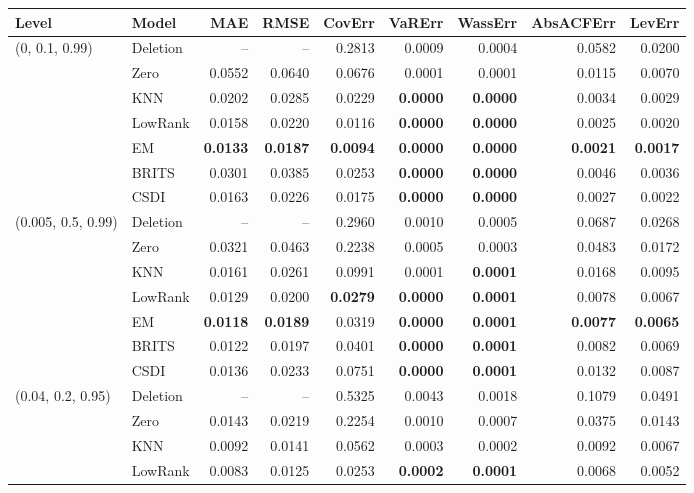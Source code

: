 {\fontsize{4.9}{5.5}\selectfont\setlength{\tabcolsep}{9pt}
\setlength{\aboverulesep}{0.25ex}\setlength{\belowrulesep}{0.4ex}
\begin{tabular}{@{}llrrrrrrr@{}}
\toprule
Level & Model & MAE & RMSE & CovErr & VaRErr & WassErr & AbsACFErr & LevErr \\
\midrule
(0, 0.1, 0.99) & Deletion & -- & -- & 0.2813 & 0.0009 & 0.0004 & 0.0582 & 0.0200 \\
 & Zero & 0.0552 & 0.0640 & 0.0676 & 0.0001 & 0.0001 & 0.0115 & 0.0070 \\
 & KNN & 0.0202 & 0.0285 & 0.0229 & \textbf{0.0000} & \textbf{0.0000} & 0.0034 & 0.0029 \\
 & LowRank & 0.0158 & 0.0220 & 0.0116 & \textbf{0.0000} & \textbf{0.0000} & 0.0025 & 0.0020 \\
 & EM & \textbf{0.0133} & \textbf{0.0187} & \textbf{0.0094} & \textbf{0.0000} & \textbf{0.0000} & \textbf{0.0021} & \textbf{0.0017} \\
 & BRITS & 0.0301 & 0.0385 & 0.0253 & \textbf{0.0000} & \textbf{0.0000} & 0.0046 & 0.0036 \\
 & CSDI & 0.0163 & 0.0226 & 0.0175 & \textbf{0.0000} & \textbf{0.0000} & 0.0027 & 0.0022 \\
\midrule
(0.005, 0.5, 0.99) & Deletion & -- & -- & 0.2960 & 0.0010 & 0.0005 & 0.0687 & 0.0268 \\
 & Zero & 0.0321 & 0.0463 & 0.2238 & 0.0005 & 0.0003 & 0.0483 & 0.0172 \\
 & KNN & 0.0161 & 0.0261 & 0.0991 & 0.0001 & \textbf{0.0001} & 0.0168 & 0.0095 \\
 & LowRank & 0.0129 & 0.0200 & \textbf{0.0279} & \textbf{0.0000} & \textbf{0.0001} & 0.0078 & 0.0067 \\
 & EM & \textbf{0.0118} & \textbf{0.0189} & 0.0319 & \textbf{0.0000} & \textbf{0.0001} & \textbf{0.0077} & \textbf{0.0065} \\
 & BRITS & 0.0122 & 0.0197 & 0.0401 & \textbf{0.0000} & \textbf{0.0001} & 0.0082 & 0.0069 \\
 & CSDI & 0.0136 & 0.0233 & 0.0751 & \textbf{0.0000} & \textbf{0.0001} & 0.0132 & 0.0087 \\
\midrule
(0.04, 0.2, 0.95) & Deletion & -- & -- & 0.5325 & 0.0043 & 0.0018 & 0.1079 & 0.0491 \\
 & Zero & 0.0143 & 0.0219 & 0.2254 & 0.0010 & 0.0007 & 0.0375 & 0.0143 \\
 & KNN & 0.0092 & 0.0141 & 0.0562 & 0.0003 & 0.0002 & 0.0092 & 0.0067 \\
 & LowRank & 0.0083 & 0.0125 & 0.0253 & \textbf{0.0002} & \textbf{0.0001} & 0.0068 & 0.0052 \\

\end{tabular}}
